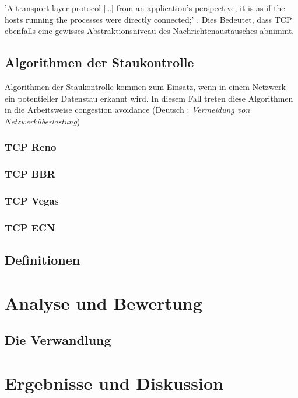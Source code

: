 \documentclass[paper=a4,fontsize=12pt,ngerman]{scrartcl}
\begin{document}
'A transport-layer protocol [\dots] from an application’s perspective, it is as if 
the hosts running the processes were directly connected;' \cite[241]{kr22}. 
Dies Bedeutet, dass TCP ebenfalls eine gewisses Abstraktionsniveau
 des Nachrichtenaustausches abnimmt. 


\subsection{Algorithmen der Staukontrolle }

Algorithmen der Staukontrolle kommen zum Einsatz, wenn in einem Netzwerk ein potentieller Datenstau erkannt wird.
In diesem Fall treten diese Algorithmen in die Arbeitsweise congestion avoidance  (Deutsch : \textit{Vermeidung von Netzwerküberlastung})


\subsubsection{TCP Reno}

\subsubsection{TCP BBR} 

\subsubsection{TCP Vegas}

\subsubsection{TCP ECN}




\subsection{Definitionen}


\section{Analyse und Bewertung}


\subsection{Die Verwandlung}


\section{Ergebnisse und Diskussion}
\end{document}

